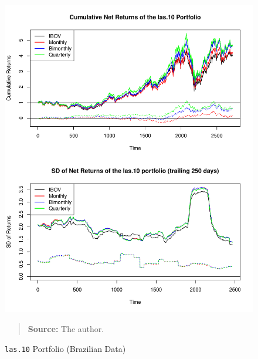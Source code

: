 \documentclass[preprint, doubleblind, authoryear,10pt]{elsarticle}
\begin{document}
\begin{figure}[htpb]
\centering
\footnotesize
\caption{\texttt{las.10} Portfolio (Brazilian Data)}
\label{fig:ibov:las.10}
\includegraphics[width=.95\linewidth]{./figs/IBOV-retac-las-10.pdf}
\begin{quote}
\textbf{Source:} The author.
\end{quote}
\end{figure}
\end{document}
